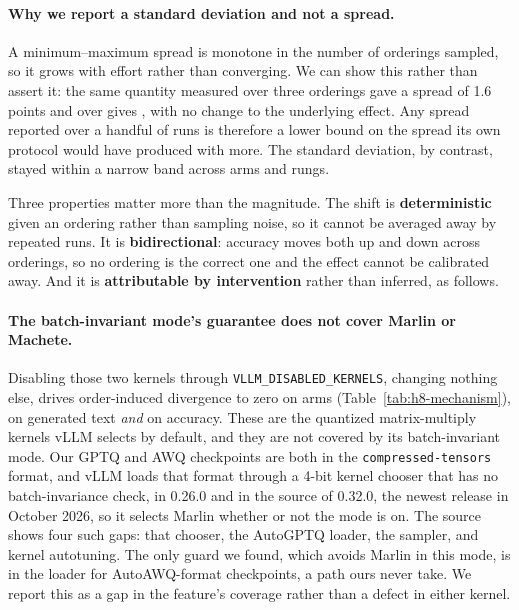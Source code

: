 \documentclass[11pt]{article}
\begin{document}
\begin{table}[t]
\centering
\small

\caption{Accuracy across \hEightSDOrderings{} orderings of the same
\hEightItems{} items, in accuracy points, measured at the served batch size
$B=\hEightSDLevel$ (\S\ref{sec:determinism}). The standard deviation is the
inferential quantity; the range is descriptive only, being unstable and monotone in
the number of orderings sampled. \texttt{bf16} is identical under every ordering at
both rungs.}
\label{tab:h8-sd}
\end{table}

\paragraph{Why we report a standard deviation and not a spread.}
A minimum--maximum spread is monotone in the number of orderings sampled, so it
grows with effort rather than converging. We can show this rather than assert it:
the same quantity measured over three orderings gave a spread of 1.6 points and
over \hEightSDOrderings{} gives \hEightRangeTen{}, with no change to the
underlying effect. Any spread reported over a handful of runs is therefore a lower
bound on the spread its own protocol would have produced with more. The standard
deviation, by contrast, stayed within a narrow band across arms and rungs.

Three properties matter more than the magnitude. The shift is
\textbf{deterministic} given an ordering rather than sampling noise, so it
cannot be averaged away by repeated runs. It is \textbf{bidirectional}:
accuracy moves both up and down across orderings, so no ordering is the correct
one and the effect cannot be calibrated away. And it is \textbf{attributable by
intervention} rather than inferred, as follows.

\paragraph{The batch-invariant mode's guarantee does not cover Marlin or Machete.}
Disabling those two kernels through \texttt{VLLM\_DISABLED\_KERNELS}, changing
nothing else, drives order-induced divergence to zero on \hEightPinned{} arms
(Table~\ref{tab:h8-mechanism}), on generated text \emph{and} on accuracy.
These are the quantized matrix-multiply kernels vLLM selects by default, and
they are not covered by its batch-invariant mode. Our GPTQ and AWQ checkpoints are both
in the \texttt{compressed-tensors} format, and vLLM loads that format through a 4-bit
kernel chooser that has no batch-invariance check, in 0.26.0 and in the source of 0.32.0,
the newest release in October 2026, so it selects Marlin whether or not the mode is on. The source shows
four such gaps: that chooser, the AutoGPTQ loader, the sampler, and kernel autotuning. The
only guard we found, which avoids Marlin in this mode, is in the loader for AutoAWQ-format
checkpoints, a path ours never take. We report this as a gap in the feature's coverage
rather than a defect in either kernel.
\end{document}
